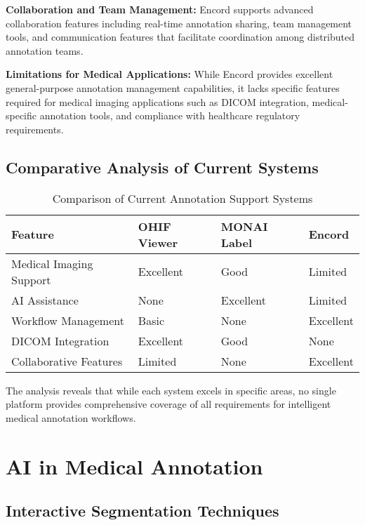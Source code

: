 \textbf{Collaboration and Team Management:} Encord supports advanced collaboration features including real-time annotation sharing, team management tools, and communication features that facilitate coordination among distributed annotation teams.

\textbf{Limitations for Medical Applications:} While Encord provides excellent general-purpose annotation management capabilities, it lacks specific features required for medical imaging applications such as DICOM integration, medical-specific annotation tools, and compliance with healthcare regulatory requirements.

\subsection{Comparative Analysis of Current Systems}

\begin{table}[htbp]
\centering
\caption{Comparison of Current Annotation Support Systems}
\label{tab:system-comparison}
\begin{tabular}{|p{2.5cm}|p{3cm}|p{3cm}|p{3cm}|}
\hline
\textbf{Feature} & \textbf{OHIF Viewer} & \textbf{MONAI Label} & \textbf{Encord} \\
\hline
Medical Imaging Support & Excellent & Good & Limited \\
\hline
AI Assistance & None & Excellent & Limited \\
\hline
Workflow Management & Basic & None & Excellent \\
\hline
DICOM Integration & Excellent & Good & None \\
\hline
Collaborative Features & Limited & None & Excellent \\
\hline
\end{tabular}
\end{table}

The analysis reveals that while each system excels in specific areas, no single platform provides comprehensive coverage of all requirements for intelligent medical annotation workflows.

\section{AI in Medical Annotation}

\subsection{Interactive Segmentation Techniques}

